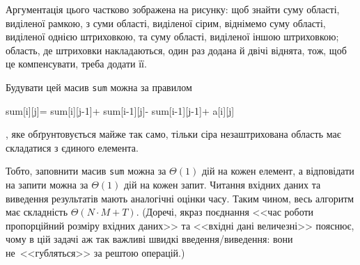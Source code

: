 Аргументація цього частково зображена на рисунку: щоб знайти суму області, виділеної рамкою, з суми області, виділеної сірим, віднімемо суму області, виділеної однією штриховкою, та суму області, виділеної іншою штриховкою; область, де штриховки накладаються, один раз додана й двічі віднята, тож, щоб це компенсувати, треба додати її.

Будувати цей масив \texttt{sum} можна за правилом
\begin{ttfamily}%
sum[i][j]\nolinebreak\hspace{0.125em plus 0.125em}=\nolinebreak[2]\hspace{0.125em plus 0.125em}%
sum[i][j-1]\nolinebreak\hspace{0.125em plus 0.125em}+\nolinebreak[2]\hspace{0.125em plus 0.125em}%
sum[i-1][j]\nolinebreak\hspace{0.125em plus 0.125em}-\nolinebreak[2]\hspace{0.125em plus 0.125em}%
sum[i-1][j-1]\nolinebreak\hspace{0.125em plus 0.125em}+\nolinebreak[2]\hspace{0.125em plus 0.125em}%
a[i][j]\end{ttfamily}, яке обґрунтовується майже так само, тільки сіра незаштрихована область має складатися з єдиного елемента.

Тобто, заповнити масив \texttt{sum} можна за $\Theta(1)$ дій на кожен елемент, а відповідати на запити можна за $\Theta(1)$ дій на кожен запит. Читання вхідних даних та виведення результатів мають аналогічні оцінки часу. Таким чином, весь алгоритм має складність ${\Theta(N{\cdot}M+T)}$. (До\nolinebreak[3] речі, якраз поєднання <<час роботи пропорційний розміру вхідних даних>> та <<вхідні дані величезні>> пояснює, чому в цій задачі аж так важливі швидкі введення/\nolinebreak[3]виве\-дення: вони не~<<губляться>> за рештою операцій.)


